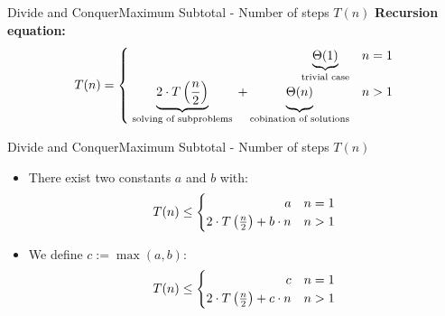 



\begin{frame}{Divide and Conquer}{Maximum Subtotal - Number of steps $T(n)$}
  \textbf{Recursion equation:}
  \begin{displaymath}
    T(n) = \begin{cases}
      \hfill \underbrace{\Theta(1)}_\text{trivial case} & n = 1\\
      \underbrace{2 \cdot T\left(\frac{n}{2}\right)}_\text{
        solving of subproblems
      } + \underbrace{
        \Theta(n)
        \vphantom{\left(\frac{n}{2}\right)}
      }_\text{cobination of solutions} & n > 1
    \end{cases}
  \end{displaymath}
\end{frame}


\begin{frame}{Divide and Conquer}{Maximum Subtotal - Number of steps $T(n)$}
  \begin{itemize}
    \item
      There exist two constants $a$ and $b$ with:
      \begin{displaymath}
        T(n) \leq \begin{cases}
          \hfill a & n = 1\\
          2 \cdot T\left(\frac{n}{2}\right) + b \cdot n & n > 1
        \end{cases}
      \end{displaymath}
    \item
      We define $c := \max(a,b)$:
      \begin{displaymath}
        T(n) \leq \begin{cases}
          \hfill c & n = 1\\
          2 \cdot T\left(\frac{n}{2}\right) + c \cdot n & n > 1
        \end{cases}
      \end{displaymath}
  \end{itemize}
\end{frame}

